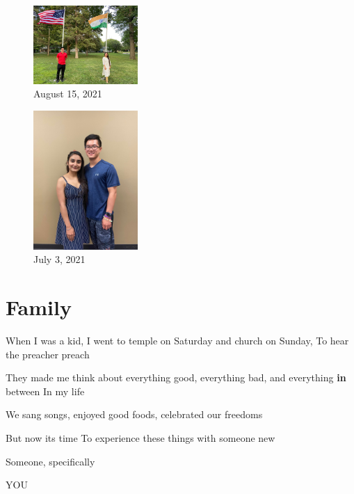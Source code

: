 \documentclass[
]{book}
\newenvironment{Shaded}{\begin{snugshade}}{\end{snugshade}}
\newcommand{\ControlFlowTok}[1]{\textcolor[rgb]{0.13,0.29,0.53}{\textbf{#1}}}
\newcommand{\NormalTok}[1]{#1}
\begin{document}
\begin{figure}
\centering
\includegraphics[width=1.5625in,height=\textheight]{mimages/12.1 8-15-2021.jpg}
\caption{August 15, 2021}
\end{figure}

\begin{figure}
\centering
\includegraphics[width=1.5625in,height=\textheight]{mimages/11.1 7-3-2021.jpg}
\caption{July 3, 2021}
\end{figure}

\hypertarget{family}{%
\chapter{Family}\label{family}}

\begin{Shaded}
\begin{Highlighting}[]
\NormalTok{When I was a kid,}
\NormalTok{I went to temple on Saturday }
\NormalTok{and church on Sunday,}
\NormalTok{To hear the preacher preach}

\NormalTok{They made me think about everything good,}
\NormalTok{everything bad,}
\NormalTok{and everything }\ControlFlowTok{in}\NormalTok{ between}
\NormalTok{In my life}

\NormalTok{We sang songs,}
\NormalTok{enjoyed good foods,}
\NormalTok{celebrated our freedoms}

\NormalTok{But now its time}
\NormalTok{To experience these things}
\NormalTok{with someone new}

\NormalTok{Someone,}
\NormalTok{specifically }

\NormalTok{YOU}
\end{Highlighting}
\end{Shaded}
\end{document}
